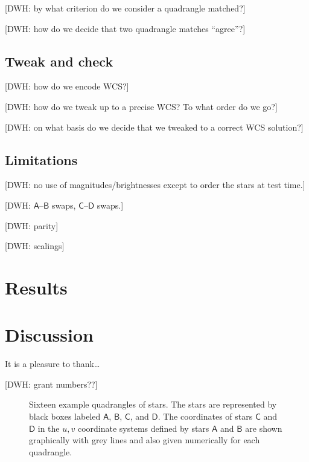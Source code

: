 \documentclass[12pt,preprint]{aastex}
\newcommand{\starlabel}[1]{\mathsf{#1}}
\newcommand{\AAA}{\starlabel{A}}
\newcommand{\BBB}{\starlabel{B}}
\newcommand{\CCC}{\starlabel{C}}
\newcommand{\DDD}{\starlabel{D}}
\begin{document}
[DWH: by what criterion do we consider a quadrangle matched?]

[DWH: how do we decide that two quadrangle matches ``agree''?]

\subsection{Tweak and check}

[DWH: how do we encode WCS?]

[DWH: how do we tweak up to a precise WCS?  To what order do we go?]

[DWH: on what basis do we decide that we tweaked to a correct WCS
  solution?]

\subsection{Limitations}

[DWH: no use of magnitudes/brightnesses except to order the stars at
  test time.]

[DWH: $\AAA$--$\BBB$ swaps, $\CCC$--$\DDD$ swaps.]

[DWH: parity]

[DWH: scalings]

\section{Results}

\section{Discussion}

\acknowledgements
It is a pleasure to thank\ldots

[DWH: grant numbers??]




\clearpage
\begin{figure}
\caption{Sixteen example quadrangles of stars.  The stars are
  represented by black boxes labeled $\AAA$, $\BBB$, $\CCC$, and
  $\DDD$.  The coordinates of stars $\CCC$ and $\DDD$ in the $u,v$
  coordinate systems defined by stars $\AAA$ and $\BBB$ are shown
  graphically with grey lines and also given numerically for each
  quadrangle.\label{fig:quad}}
\end{figure}
\end{document}
